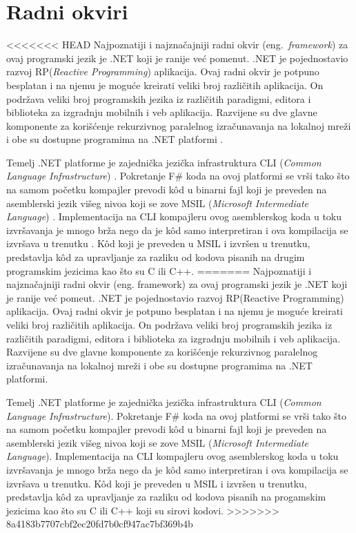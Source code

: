 \documentclass[a4paper]{article}
\begin{document}
\section{Radni okviri}

<<<<<<< HEAD
Najpoznatiji i najznačajniji radni okvir (eng.~{\em framework}) za ovaj programski jezik je .NET koji je ranije već pomenut. .NET je pojednostavio razvoj RP({\em Reactive Programming}) \cite{RPapp} aplikacija. Ovaj radni okvir je potpuno besplatan i na njemu je moguće kreirati veliki broj različitih aplikacija. On podržava veliki broj programskih jezika iz različitih paradigmi, editora i biblioteka za izgradnju mobilnih i veb aplikacija. Razvijene su dve glavne komponente za korišćenje rekurzivnog paralelnog izračunavanja na lokalnoj mreži i obe su dostupne programima na .NET platformi \cite{ppNETframework}. 

Temelj .NET platforme je zajednička jezička infrastruktura CLI ({\em Common Language Infrastructure}) \cite{cli}. Pokretanje F\# koda na ovoj platformi se vrši tako što na samom početku kompajler prevodi kôd u binarni fajl koji je preveden na asemblerski jezik višeg nivoa koji se zove MSIL ({\em Microsoft Intermediate Language}) \cite{msil}. Implementacija na CLI kompajleru ovog asemblerskog koda u toku izvršavanja je mnogo brža nego da je kôd samo interpretiran i ova kompilacija se izvršava u trenutku \cite{progFs}.
Kôd koji je preveden u MSIL i izvršen u trenutku, predstavlja kôd za upravljanje za razliku od kodova pisanih na drugim programskim jezicima kao što su C ili C++.   
=======
Najpoznatiji i najznačajniji radni okvir (eng. framework) za ovaj programski jezik je .NET koji je ranije već pomeut. .NET je pojednostavio razvoj RP(Reactive Programming)\cite{RPapp} aplikacija. Ovaj radni okvir je potpuno besplatan i na njemu je moguće kreirati veliki broj različitih aplikacija. On podržava veliki broj programskih jezika iz različitih paradigmi, editora i biblioteka za izgradnju mobilnih i veb aplikacija. Razvijene su dve glavne komponente za korišćenje rekurzivnog paralelnog izračunavanja na lokalnoj mreži i obe su dostupne programima na .NET platformi\cite{ppNETframework}. 

Temelj .NET platforme je zajednička jezička infrastruktura CLI ({\em Common Language Infrastructure})\cite{cli}. Pokretanje F\# koda na ovoj platformi se vrši tako što na samom početku kompajler prevodi kôd u binarni fajl koji je preveden na asemblerski jezik višeg nivoa koji se zove MSIL ({\em Microsoft Intermediate Language})\cite{msil}. Implementacija na CLI kompajleru ovog asemblerskog koda u toku izvršavanja je mnogo brža nego da je kôd samo interpretiran i ova kompilacija se izvršava u trenutku\cite{progFs}.
Kôd koji je preveden u MSIL i izvršen u trenutku, predstavlja kôd za upravljanje za razliku od kodova pisanih na progamskim jezicima kao što su C ili C++ koji su sirovi kodovi.   
>>>>>>> 8a4183b7707cbf2ec20fd7b0cf947ac7bf369b4b
\end{document}
